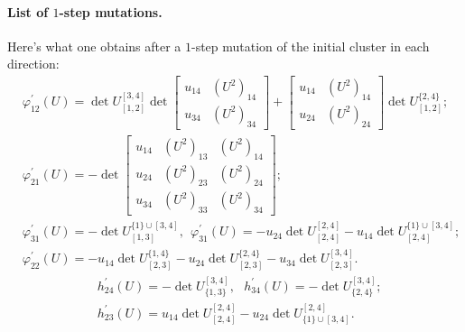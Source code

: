 \paragraph{List of $1$-step mutations.} Here's what one obtains after a $1$-step mutation of the initial cluster in each direction:
\begin{align}
&\varphi_{12}^\prime(U) = \det U_{[1,2]}^{[3,4]} \det \begin{bmatrix}
    u_{14} & (U^2)_{14}\\ u_{34} & (U^2)_{34} 
\end{bmatrix} + \begin{bmatrix}
    u_{14} & (U^2)_{14}\\ u_{24} & (U^2)_{24} 
\end{bmatrix} \det U_{[1,2]}^{\{2,4\}};\\
&\varphi_{21}^\prime(U) = -\det \begin{bmatrix}
    u_{14} & (U^2)_{13} & (U^2)_{14}\\
    u_{24} & (U^2)_{23} & (U^2)_{24}\\
    u_{34} & (U^2)_{33} & (U^2)_{34}
\end{bmatrix};\\
    &\varphi_{31}^\prime(U) = -\det U_{[1,3]}^{\{1\}\cup[3,4]}, \ \ 
\varphi_{31}^\prime(U) = -u_{24}\det U_{[2,4]}^{[2,4]} - u_{14} \det U_{[2,4]}^{\{1\}\cup[3,4]};\\&\varphi_{22}^\prime(U) = -u_{14}\det U_{[2,3]}^{\{1,4\}} - u_{24} \det U_{[2,3]}^{\{2,4\}} - u_{34} \det U_{[2,3]}^{[3,4]}.
\end{align}
\begin{align}
    &h_{24}^\prime(U) = -\det U_{\{1,3\}}^{[3,4]},\ \ \ h_{34}^\prime(U) = -\det U_{\{2,4\}}^{[3,4]};\\
    &h_{23}^\prime(U) = u_{14}\det U_{[2,4]}^{[2,4]} - u_{24} \det U_{\{1\}\cup[3,4]}^{[2,4]}.
\end{align}